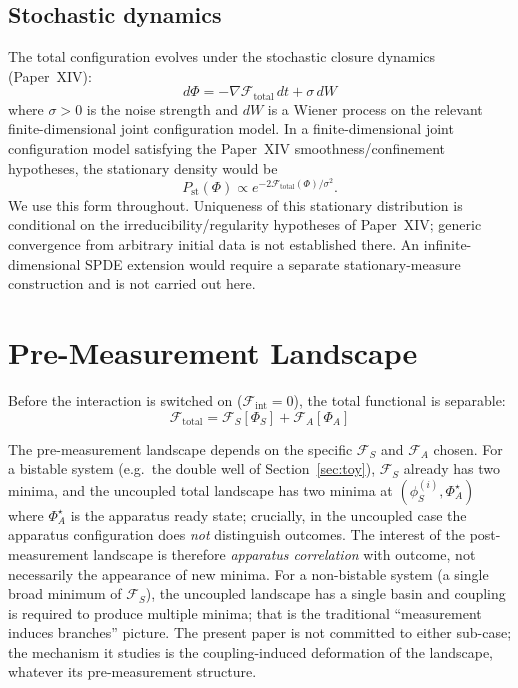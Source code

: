 \documentclass[12pt]{article}
\newcommand{\Fcal}{\mathcal{F}}
\newcommand{\Pst}{P_{\mathrm{st}}}
\begin{document}
\subsection{Stochastic dynamics}

The total configuration evolves under the stochastic closure dynamics (Paper~XIV):
\begin{equation}\label{eq:dynamics}
    d\Phi = -\nabla \Fcal_{\mathrm{total}}\, dt + \sigma\, dW
\end{equation}
where $\sigma > 0$ is the noise strength and $dW$ is a Wiener process on the relevant finite-dimensional joint configuration model. In a finite-dimensional joint configuration model satisfying the Paper~XIV smoothness/confinement hypotheses, the stationary density would be
\begin{equation}\label{eq:stationary}
    \Pst(\Phi) \propto e^{-2\Fcal_{\mathrm{total}}(\Phi)/\sigma^2}.
\end{equation}
We use this form throughout. Uniqueness of this stationary distribution is conditional on the irreducibility/regularity hypotheses of Paper~XIV; generic convergence from arbitrary initial data is not established there. An infinite-dimensional SPDE extension would require a separate stationary-measure construction and is not carried out here.

\section{Pre-Measurement Landscape}\label{sec:pre}

Before the interaction is switched on ($\Fcal_{\mathrm{int}} = 0$), the total functional is separable:
\begin{equation}
    \Fcal_{\mathrm{total}} = \Fcal_S[\Phi_S] + \Fcal_A[\Phi_A]
\end{equation}

The pre-measurement landscape depends on the specific $\Fcal_S$ and $\Fcal_A$ chosen. For a bistable system (e.g.\ the double well of Section~\ref{sec:toy}), $\Fcal_S$ already has two minima, and the uncoupled total landscape has two minima at $(\phi_S^{(i)}, \Phi_A^\star)$ where $\Phi_A^\star$ is the apparatus ready state; crucially, in the uncoupled case the apparatus configuration does \emph{not} distinguish outcomes. The interest of the post-measurement landscape is therefore \emph{apparatus correlation} with outcome, not necessarily the appearance of new minima. For a non-bistable system (a single broad minimum of $\Fcal_S$), the uncoupled landscape has a single basin and coupling is required to produce multiple minima; that is the traditional ``measurement induces branches'' picture. The present paper is not committed to either sub-case; the mechanism it studies is the coupling-induced deformation of the landscape, whatever its pre-measurement structure.
\end{document}
